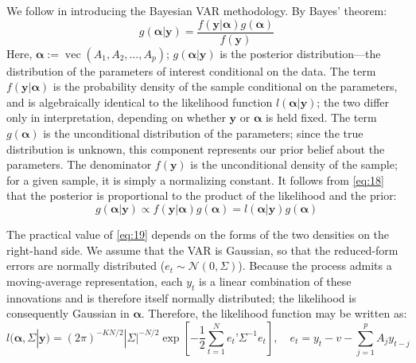 \documentclass[12pt, a4paper]{article}
\begin{document}
We follow \citet[chapt. 5]{lutkepohlNewIntroductionMultiple2005} in introducing the Bayesian VAR methodology. By Bayes' theorem:
\begin{equation} \label{eq:18}
g(\boldsymbol{\alpha}|\mathbf{y}) = \frac{f(\mathbf{y}|\boldsymbol{\alpha})g(\boldsymbol{\alpha})}{f(\mathbf{y})}
\end{equation}
Here, $\boldsymbol{\alpha}:= \operatorname{vec}(A_1,A_2, \dots, A_p)$; $g(\boldsymbol{\alpha}|\mathbf{y})$ is the posterior distribution—the distribution of the parameters of interest conditional on the data. The term $f(\mathbf{y}|\boldsymbol{\alpha})$ is the probability density of the sample conditional on the parameters, and is algebraically identical to the likelihood function $l(\boldsymbol{\alpha}|\mathbf{y})$; the two differ only in interpretation, depending on whether $\mathbf{y}$ or $\boldsymbol{\alpha}$ is held fixed. The term $g(\boldsymbol{\alpha})$ is the unconditional distribution of the parameters; since the true distribution is unknown, this component represents our prior belief about the parameters. The denominator $f(\mathbf{y})$ is the unconditional density of the sample; for a given sample, it is simply a normalizing constant. It follows from \eqref{eq:18} that the posterior is proportional to the product of the likelihood and the prior:
\begin{equation} \label{eq:19}
g(\boldsymbol{\alpha}|\mathbf{y}) \propto f(\mathbf{y}|\boldsymbol{\alpha})g(\boldsymbol{\alpha}) = l(\boldsymbol{\alpha}|\mathbf{y})g(\boldsymbol{\alpha})
\end{equation}

The practical value of \eqref{eq:19} depends on the forms of the two densities on the right-hand side. We assume that the VAR is Gaussian, so that the reduced-form errors are normally distributed ($e_t \sim \mathcal{N}(0, \Sigma)$). Because the process admits a moving-average representation, each $y_t$ is a linear combination of these innovations and is therefore itself normally distributed; the likelihood is consequently Gaussian in $\boldsymbol{\alpha}$. Therefore, the likelihood function may be written as:
\begin{equation} \label{eq:21}
l(\boldsymbol{\alpha}, \Sigma | \mathbf{y}) = (2\pi)^{-KN/2}|\Sigma|^{-N/2} \exp \left[ -\frac{1}{2} \sum_{t=1}^N e_t’ \Sigma^{-1} e_t \right] , \quad e_t = y_t - v - \sum_{j=1}^p A_j y_{t-j}
\end{equation}
\end{document}
